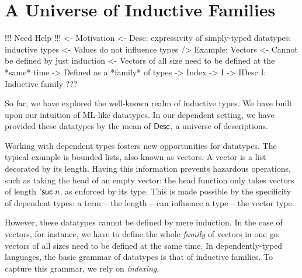 \section{A Universe of Inductive Families}
\label{sec:indexing-desc}

\begin{wstructure}
!!! Need Help !!!
<- Motivation
    <- Desc: expressivity of simply-typed datatypes: inductive types
        <- Values do not influence types
    /> Example: Vectors
        <- Cannot be defined by just induction
            <- Vectors of all size need to be defined at the *same* time
            -> Defined as a *family* of types
                -> Index
        -> I -> IDesc I: Inductive family
    ???
\end{wstructure}

So far, we have explored the well-known realm of inductive types. We
have built upon our intuition of ML-like datatypes. In our dependent
setting, we have provided these datatypes by the mean of $\Desc$, a
universe of descriptions.

Working with dependent types fosters new opportunities for
datatypes. The typical example is bounded lists, also known as
vectors. A vector is a list decorated by its length. Having this
information prevents hazardous operations, such as taking the head of
an empty vector: the head function only takes vectors of length
$\NatSuc{\V{n}}$, as enforced by its type. This is made possible by
the specificity of dependent types: a term -- the length -- can
influence a type -- the vector type.

However, these datatypes cannot be defined by mere induction. In the
case of vectors, for instance, we have to define the whole
\emph{family} of vectors in one go: vectors of all sizes need to be
defined at the same time. In dependently-typed languages, the basic
grammar of datatypes is that of inductive families. To capture this
grammar, we rely on \emph{indexing}.



